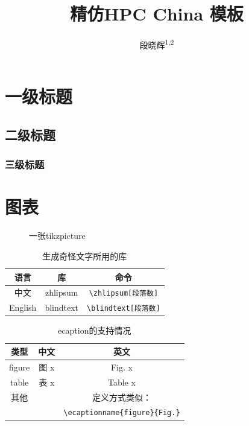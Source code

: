 \documentclass[a4paper, nosysfonts]{hpcchina}
\title{精仿HPC China \XeLaTeX 模板}
\author{段晓辉\textsuperscript{1,2}}
\affiliation{
  \textsuperscript{1} 清华大学，北京 100084
  
  \textsuperscript{2} 国家超级计算无锡中心，无锡 214072
}
\begin{document}
    \maketitle
    \zhlipsum[10]
    \section{一级标题}
    \zhlipsum[1]
    \subsection{二级标题}
    \zhlipsum[1]
    \subsubsection{三级标题}
    \zhlipsum[10]
    \section{图表}
    \zhlipsum[2]
    \zhlipsum[1]
    \begin{figure}[!htbp]
      \centering
      \caption{一张tikzpicture
      }
    \end{figure}
    \zhlipsum[1]
    \begin{table}[!htbp]
      \centering
      \caption{生成奇怪文字所用的库
      }
      \begin{tabular}{|c|c|c|}\hline
        语言 & 库 & 命令\\\hline
        中文 & zhlipsum & \verb|\zhlipsum[段落数]|\\\hline
        English & blindtext & \verb|\blindtext[段落数]|\\\hline
      \end{tabular}
    \end{table}
    \begin{table}[!htbp]
      \centering
      \caption{ecaption的支持情况
      }
      \begin{tabular}{|c|c|c|}\hline
        类型 & 中文 & 英文\\\hline
        figure & 图 x& Fig. x\\\hline
        table & 表 x& Table x\\\hline
        其他 & & 定义方式类似：\\
         &  & \verb|\ecaptionname{figure}{Fig.}|\\\hline
      \end{tabular}
    \end{table}
\end{document}
